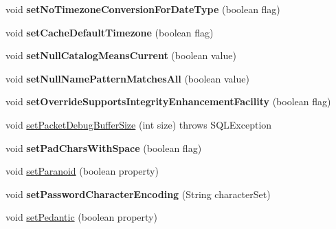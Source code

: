 \begin{DoxyCompactItemize}
void {\bfseries set\+No\+Timezone\+Conversion\+For\+Date\+Type} (boolean flag)
\item 
\mbox{\label{classcom_1_1mysql_1_1jdbc_1_1_multi_host_my_s_q_l_connection_a8d70be44b5f2b25895e32373b5427213}} 
void {\bfseries set\+Cache\+Default\+Timezone} (boolean flag)
\item 
\mbox{\label{classcom_1_1mysql_1_1jdbc_1_1_multi_host_my_s_q_l_connection_a33cbfaa3aa61db8ac7f710dffc20c460}} 
void {\bfseries set\+Null\+Catalog\+Means\+Current} (boolean value)
\item 
\mbox{\label{classcom_1_1mysql_1_1jdbc_1_1_multi_host_my_s_q_l_connection_a54e100adc2177e38d81afd6e8551807f}} 
void {\bfseries set\+Null\+Name\+Pattern\+Matches\+All} (boolean value)
\item 
\mbox{\label{classcom_1_1mysql_1_1jdbc_1_1_multi_host_my_s_q_l_connection_ae0bcb86c66af1c7e926161b8c49d92c1}} 
void {\bfseries set\+Override\+Supports\+Integrity\+Enhancement\+Facility} (boolean flag)
\item 
void \mbox{\hyperlink{classcom_1_1mysql_1_1jdbc_1_1_multi_host_my_s_q_l_connection_a40dfa273870f39c257a9eb9feaad70b0}{set\+Packet\+Debug\+Buffer\+Size}} (int size)  throws S\+Q\+L\+Exception 
\item 
\mbox{\label{classcom_1_1mysql_1_1jdbc_1_1_multi_host_my_s_q_l_connection_a5c79f8db2ecc78060dc05b9339ad0c21}} 
void {\bfseries set\+Pad\+Chars\+With\+Space} (boolean flag)
\item 
void \mbox{\hyperlink{classcom_1_1mysql_1_1jdbc_1_1_multi_host_my_s_q_l_connection_a90febab2aa995ba6ef06ebaf57ffd087}{set\+Paranoid}} (boolean property)
\item 
\mbox{\label{classcom_1_1mysql_1_1jdbc_1_1_multi_host_my_s_q_l_connection_a3d6f2d959a1f9958950b66f97b2d4847}} 
void {\bfseries set\+Password\+Character\+Encoding} (String character\+Set)
\item 
void \mbox{\hyperlink{classcom_1_1mysql_1_1jdbc_1_1_multi_host_my_s_q_l_connection_a9e6d76a788879ee7f45d6407d89a63c0}{set\+Pedantic}} (boolean property)

\end{DoxyCompactItemize}
